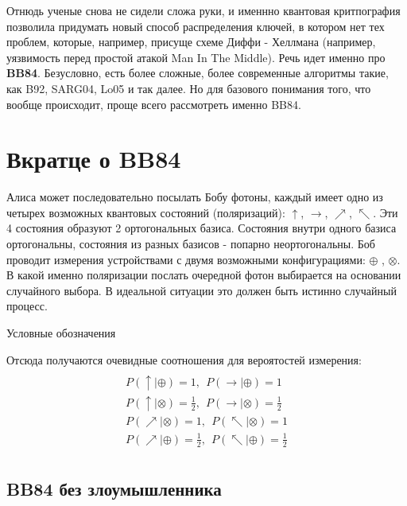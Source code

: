 Отнюдь ученые снова не сидели сложа руки, и именнно квантовая критпография позволила придумать новый способ распределения ключей, в котором нет тех проблем, которые, например, присуще схеме Диффи - Хеллмана (например, уязвимость перед простой атакой Man In The Middle).
Речь идет именно про \textbf{BB84}. Безусловно, есть более сложные, более современные алгоритмы такие, как B92, SARG04, Lo05 и так далее. Но для базового понимания того, что вообще происходит, проще всего рассмотреть именно BB84.

\section{Вкратце о BB84}

Алиса может последовательно посылать Бобу фотоны, каждый имеет одно из четырех возможных квантовых состояний (поляризаций):  $\uparrow$, $\rightarrow$, $\nearrow$, $\nwarrow$. 
Эти 4 состояния образуют 2 ортогональных базиса. Состояния внутри одного базиса ортогональны, состояния из разных базисов - попарно неортогональны. 
Боб проводит измерения устройствами с двумя возможными конфигурациями: $\oplus$ , $\otimes$. В какой именно поляризации послать очередной фотон выбирается на основании случайного выбора. В идеальной ситуации это должен быть истинно случайный процесс.

\begin{table}[h!]
    \centering
    
    \caption{Условные обозначения}
\label{tb1}
\end{table}

Отсюда получаются очевидные соотношения для вероятостей измерения:
\begin{multline}
    \\
    P(\uparrow | \oplus) = 1,\:\: P(\rightarrow | \oplus) = 1                           \\
    P(\uparrow | \otimes) = \frac{1}{2}, \:\: P(\rightarrow | \otimes) = \frac{1}{2}    \\
    P(\nearrow | \otimes) = 1,\:\: P(\nwarrow | \otimes) = 1                           \\
    P(\nearrow | \oplus) = \frac{1}{2}, \:\: P(\nwarrow | \oplus) = \frac{1}{2}    \\
\end{multline}


\subsection{BB84 без злоумышленника}

